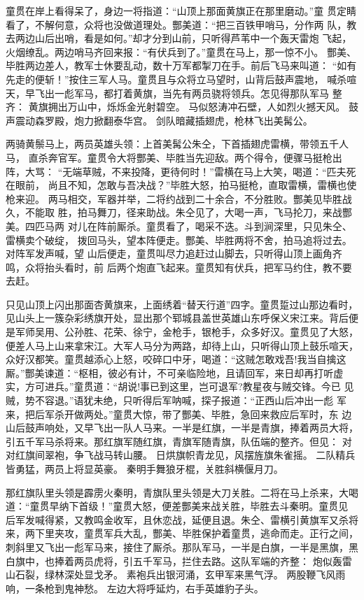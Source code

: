 童贯在岸上看得呆了，身边一将指道：“山顶上那面黄旗正在那里磨动。”童
贯定睛看了，不解何意，众将也没做道理处。酆美道：“把三百铁甲哨马，分作两
队，教去两边山后出哨，看是如何。”却才分到山前，只听得芦苇中一个轰天雷炮
飞起，火烟缭乱。两边哨马齐回来报：“有伏兵到了。”童贯在马上，那一惊不小。
酆美、毕胜两边差人，教军士休要乱动，数十万军都掣刀在手。前后飞马来叫道：
“如有先走的便斩！”按住三军人马。童贯且与众将立马望时，山背后鼓声震地，
喊杀喧天，早飞出一彪军马，都打着黄旗，当先有两员骁将领兵。怎见得那队军马
整齐：
黄旗拥出万山中，烁烁金光射碧空。
马似怒涛冲石壁，人如烈火撼天风。
鼓声震动森罗殿，炮力掀翻泰华宫。
剑队暗藏插翅虎，枪林飞出美髯公。

两骑黄鬃马上，两员英雄头领：上首美髯公朱仝，下首插翅虎雷横，带领五千人马，
直杀奔官军。童贯令大将酆美、毕胜当先迎敌。两个得令，便骤马挺枪出阵，大骂：
“无端草贼，不来投降，更待何时！”雷横在马上大笑，喝道：“匹夫死在眼前，
尚且不知，怎敢与吾决战？”毕胜大怒，拍马挺枪，直取雷横，雷横也使枪来迎。
两马相交，军器并举，二将约战到二十余合，不分胜败。酆美见毕胜战久，不能取
胜，拍马舞刀，径来助战。朱仝见了，大喝一声，飞马抡刀，来战酆美。四匹马两
对儿在阵前厮杀。童贯看了，喝采不迭。斗到涧深里，只见朱仝、雷横卖个破绽，
拨回马头，望本阵便走。酆美、毕胜两将不舍，拍马追将过去。对阵军发声喊，望
山后便走，童贯叫尽力追赶过山脚去，只听得山顶上画角齐鸣，众将抬头看时，前
后两个炮直飞起来。童贯知有伏兵，把军马约住，教不要去赶。

只见山顶上闪出那面杏黄旗来，上面绣着“替天行道”四字。童贯踅过山那边看时，
见山头上一簇杂彩绣旗开处，显出那个郓城县盖世英雄山东呼保义宋江来。背后便
是军师吴用、公孙胜、花荣、徐宁，金枪手，银枪手，众多好汉。童贯见了大怒，
便差人马上山来拿宋江。大军人马分为两路，却待上山，只听得山顶上鼓乐喧天，
众好汉都笑。童贯越添心上怒，咬碎口中牙，喝道：“这贼怎敢戏吾!我当自擒这
厮。”酆美谏道：“枢相，彼必有计，不可亲临险地，且请回军，来日却再打听虚
实，方可进兵。”童贯道：“胡说!事已到这里，岂可退军?教星夜与贼交锋。今已
见贼，势不容退。”语犹未绝，只听得后军呐喊，探子报道：“正西山后冲出一彪
军来，把后军杀开做两处。”童贯大惊，带了酆美、毕胜，急回来救应后军时，东
边山后鼓声响处，又早飞出一队人马来。一半是红旗，一半是青旗，捧着两员大将，
引五千军马杀将来。那红旗军随红旗，青旗军随青旗，队伍端的整齐。但见：
对对红旗间翠袍，争飞战马转山腰。
日烘旗帜青龙见，风摆旌旗朱雀摇。
二队精兵皆勇猛，两员上将显英豪。
秦明手舞狼牙棍，关胜斜横偃月刀。

那红旗队里头领是霹雳火秦明，青旗队里头领是大刀关胜。二将在马上杀来，大喝
道：“童贯早纳下首级！”童贯大怒，便差酆美来战关胜，毕胜去斗秦明。童贯见
后军发喊得紧，又教鸣金收军，且休恋战，延便且退。朱仝、雷横引黄旗军又杀将
来，两下里夹攻，童贯军兵大乱，酆美、毕胜保护着童贯，逃命而走。正行之间，
刺斜里又飞出一彪军马来，接住了厮杀。那队军马，一半是白旗，一半是黑旗，黑
白旗中，也捧着两员虎将，引五千军马，拦住去路。这队军端的齐整：
炮似轰雷山石裂，绿林深处显戈矛。
素袍兵出银河涌，玄甲军来黑气浮。
两股鞭飞风雨响，一条枪到鬼神愁。
左边大将呼延灼，右手英雄豹子头。

